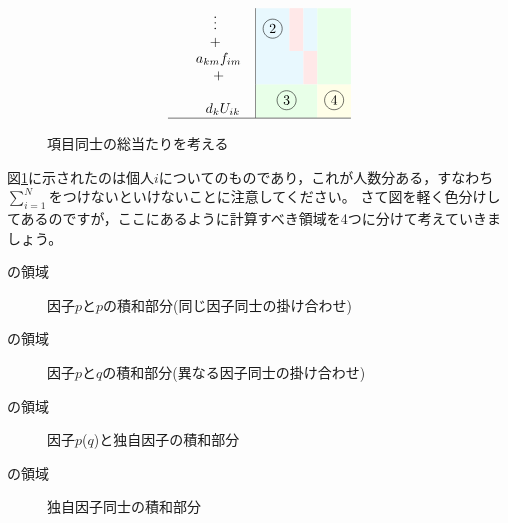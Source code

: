 \documentclass{ltjsbook}
\begin{document}
\begin{figure}[ht]
\[\begin{array}{rl|cccccc|}
			        & \hspace{10pt}\begin{array}{c}\vdots\\+\end{array}     & \multicolumn{3}{>{\columncolor{cyan!9}}c}{\circled{2}}  & \multicolumn{1}{>{\columncolor{red!9}}c}{}               & \multicolumn{1}{>{\columncolor{cyan!9}}c}{}            & \multicolumn{1}{>{\columncolor{green!9}}c}{}                                         \\
			        & \begin{array}{c}a_{km}f_{im}\\+\end{array}            & \multicolumn{4}{>{\columncolor{cyan!9}}c}{}             & \multicolumn{1}{>{\columncolor{red!9}}c}{}               & \multicolumn{1}{>{\columncolor{green!9}}c}{}                                                                                                  \\
			        & \hspace{7pt}\begin{array}{c}\\d_kU_{ik}\\ \end{array} & \multicolumn{5}{>{\columncolor{green!9}}c}{\circled{3}} & \multicolumn{1}{>{\columncolor{yellow!9}}c}{\circled{4}}                                                                                                                                                 \\\hline
		\end{array}
	\]
	\caption{項目同士の総当たりを考える}
	\label{fig:03_01}
\end{figure}

図\ref{fig:03_01}に示されたのは個人$i$についてのものであり，これが人数分ある，すなわち$\sum_{i=1}^N$をつけないといけないことに注意してください。
さて図を軽く色分けしてあるのですが，ここにあるように計算すべき領域を4つに分けて考えていきましょう。
\begin{description}
	\item[の領域] 因子$p$と$p$の積和部分(同じ因子同士の掛け合わせ)
	\item[の領域] 因子$p$と$q$の積和部分(異なる因子同士の掛け合わせ)
	\item[の領域] 因子$p$($q$)と独自因子の積和部分
	\item[の領域] 独自因子同士の積和部分
\end{description}
\end{document}
